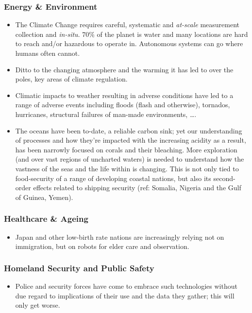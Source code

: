\documentclass[11pt,letterpaper]{article}
\begin{document}
\subsubsection{Energy \& Environment}
\begin{itemize}

\item The Climate Change requires careful, systematic and
  \emph{at-scale} measurement collection and \emph{in-situ}. 70\% of
  the planet is water and many locations are hard to reach and/or
  hazardous to operate in. Autonomous systems can go where humans
  often cannot.

\item Ditto to the changing atmosphere and the warming it has led to
  over the poles, key areas of climate regulation.

\item Climatic impacts to weather resulting in adverse conditions have
  led to a range of adverse events including floods (flash and
  otherwise), tornados, hurricanes, structural failures of man-made
  environments, \ldots.  

\item The oceans have been to-date, a reliable carbon sink; yet our
  understanding of processes and how they're impacted with the
  increasing acidity as a result, has been narrowly focused on corals
  and their bleaching. More exploration (and over vast regions of
  uncharted waters) is needed to understand how the vastness of the
  seas and the life within is changing. This is not only tied to
  food-security of a range of developing coastal nations, but also its
  second-order effects related to shipping security (ref: Somalia,
  Nigeria and the Gulf of Guinea, Yemen).

\end{itemize}

\subsubsection{Healthcare \& Ageing}
\begin{itemize}
\item Japan and other low-birth rate nations are increasingly relying
  not on immigration, but on robots for elder care and observation. 

\end{itemize}

\subsubsection{Homeland Security and Public Safety}
\begin{itemize}

\item Police and security forces have come to embrace such
  technologies without due regard to implications of their use and the
  data they gather; this will only get worse.

\end{itemize}
\end{document}
